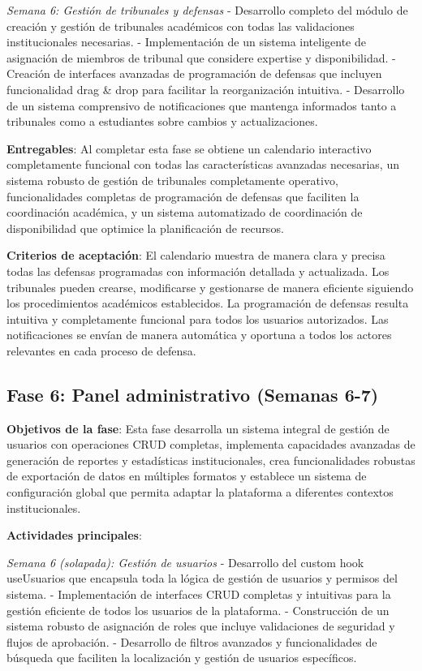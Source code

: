 \documentclass[12pt,a4paper,oneside]{report}
\begin{document}
\emph{Semana 6: Gestión de tribunales y defensas} - Desarrollo completo del módulo de creación y gestión de tribunales académicos con todas las validaciones institucionales necesarias. - Implementación de un sistema inteligente de asignación de miembros de tribunal que considere expertise y disponibilidad. - Creación de interfaces avanzadas de programación de defensas que incluyen funcionalidad drag & drop para facilitar la reorganización intuitiva. - Desarrollo de un sistema comprensivo de notificaciones que mantenga informados tanto a tribunales como a estudiantes sobre cambios y actualizaciones.

\textbf{Entregables}: Al completar esta fase se obtiene un calendario interactivo completamente funcional con todas las características avanzadas necesarias, un sistema robusto de gestión de tribunales completamente operativo, funcionalidades completas de programación de defensas que faciliten la coordinación académica, y un sistema automatizado de coordinación de disponibilidad que optimice la planificación de recursos.

\textbf{Criterios de aceptación}: El calendario muestra de manera clara y precisa todas las defensas programadas con información detallada y actualizada. Los tribunales pueden crearse, modificarse y gestionarse de manera eficiente siguiendo los procedimientos académicos establecidos. La programación de defensas resulta intuitiva y completamente funcional para todos los usuarios autorizados. Las notificaciones se envían de manera automática y oportuna a todos los actores relevantes en cada proceso de defensa.

\subsection{Fase 6: Panel administrativo (Semanas
6-7)}\label{fase-6-panel-administrativo-semanas-6-7}

\textbf{Objetivos de la fase}: Esta fase desarrolla un sistema integral de gestión de usuarios con operaciones CRUD completas, implementa capacidades avanzadas de generación de reportes y estadísticas institucionales, crea funcionalidades robustas de exportación de datos en múltiples formatos y establece un sistema de configuración global que permita adaptar la plataforma a diferentes contextos institucionales.

\textbf{Actividades principales}:

\emph{Semana 6 (solapada): Gestión de usuarios} - Desarrollo del custom hook useUsuarios que encapsula toda la lógica de gestión de usuarios y permisos del sistema. - Implementación de interfaces CRUD completas y intuitivas para la gestión eficiente de todos los usuarios de la plataforma. - Construcción de un sistema robusto de asignación de roles que incluye validaciones de seguridad y flujos de aprobación. - Desarrollo de filtros avanzados y funcionalidades de búsqueda que faciliten la localización y gestión de usuarios específicos.
\end{document}
